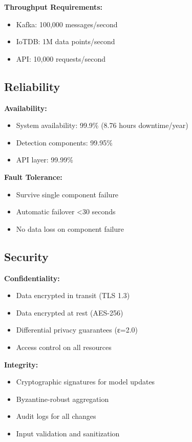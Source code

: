 \documentclass[12pt,a4paper]{article}
\begin{document}
\textbf{Throughput Requirements:}
\begin{itemize}[leftmargin=1cm,itemsep=0pt]
    \item Kafka: 100,000 messages/second
    \item IoTDB: 1M data points/second
    \item API: 10,000 requests/second
\end{itemize}

\subsection{Reliability}

\textbf{Availability:}
\begin{itemize}[leftmargin=1cm,itemsep=0pt]
    \item System availability: 99.9\% (8.76 hours downtime/year)
    \item Detection components: 99.95\%
    \item API layer: 99.99\%
\end{itemize}

\textbf{Fault Tolerance:}
\begin{itemize}[leftmargin=1cm,itemsep=0pt]
    \item Survive single component failure
    \item Automatic failover <30 seconds
    \item No data loss on component failure
\end{itemize}


\subsection{Security}

\textbf{Confidentiality:}
\begin{itemize}[leftmargin=1cm,itemsep=0pt]
    \item Data encrypted in transit (TLS 1.3)
    \item Data encrypted at rest (AES-256)
    \item Differential privacy guarantees (ε=2.0)
    \item Access control on all resources
\end{itemize}

\textbf{Integrity:}
\begin{itemize}[leftmargin=1cm,itemsep=0pt]
    \item Cryptographic signatures for model updates
    \item Byzantine-robust aggregation
    \item Audit logs for all changes
    \item Input validation and sanitization
\end{itemize}
\end{document}
